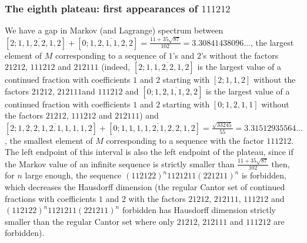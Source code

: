 \documentclass[10pt]{amsart}
\numberwithin{equation}{section}
\theoremstyle{definition}
\begin{document}
\subsubsection{The eighth plateau: first appearances of $111212$} We have a gap in Markov (and Lagrange) spectrum between $[2;\overline{1,1,2,2,1,2}]+[0;\overline{1,2,1,1,2,2}]=\frac{11+35\sqrt{87}}{102}=3.30841438096...$, the largest element of $M$ corresponding to a sequence of $1$'s and $2$'s without the factors $21212$, $111212$ and $212111$ (indeed, $[2;\overline{1,1,2,2,1,2}]$ is the largest value of a continued fraction with coefficients $1$ and $2$ starting with $[2;1,1,2]$ without the factors $21212$, $212111$and $111212$ and $[0;\overline{1,2,1,1,2,2}]$ is the largest value of a continued fraction with coefficients $1$ and $2$ starting with $[0;1,2,1,1]$ without the factors $21212$, $111212$ and $212111$) and $[2;\overline{1,2,2,1,2,1,1,1,1,2}]+[0;\overline{1,1,1,1,2,1,2,2,1,2}]=\frac{\sqrt{33245}}{55}=3.31512935564...$, the smallest element of $M$ corresponding to a sequence with the factor $111212$. The left endpoint of this interval is also the left endpoint of the plateau, since if the Markov value of an infinite sequence is strictly smaller than $\frac{11+35\sqrt{87}}{102}$ then, for $n$ large enough, the sequence $(112122)^n 1121211 (221211)^n$ is forbidden, which decreases the Hausdorff dimension (the regular Cantor set of continued fractions with coefficients $1$ and $2$ with the factors $21212$, $212111$, $111212$ and $(112122)^n 1121211 (221211)^n$ forbidden has Hausdorff dimension strictly smaller than the regular Cantor set where only $21212$, $212111$ and $111212$ are forbidden). 
\end{document}
